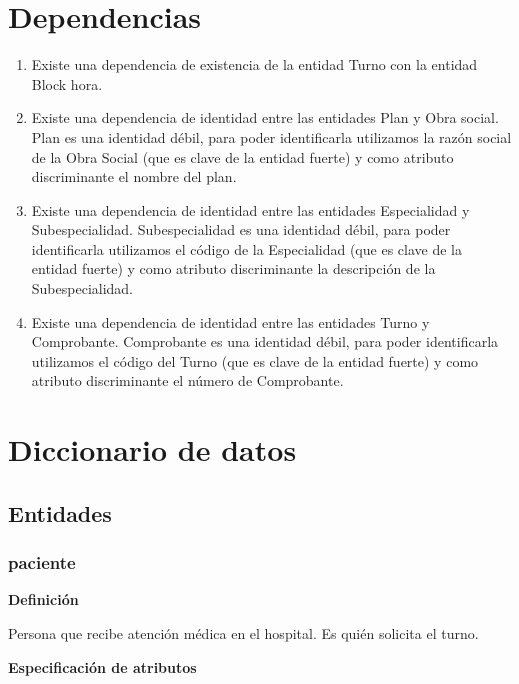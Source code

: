 \documentclass[a4paper,11pt]{article}
\begin{document}
\section{\textbf{Dependencias}}
\begin{enumerate}
\item Existe una dependencia de existencia de la entidad Turno con la entidad Block 
hora.

\item Existe una dependencia de identidad entre las entidades Plan y Obra social. 
Plan es una identidad débil, para poder identificarla utilizamos la razón social 
de la Obra Social (que es clave de la entidad fuerte) y como atributo discriminante 
el nombre del plan.

\item Existe una dependencia de identidad entre las entidades Especialidad y Subespecialidad. 
Subespecialidad es una identidad débil, para poder identificarla utilizamos el 
código de la Especialidad (que es clave de la entidad fuerte) y como atributo 
discriminante la descripción de la Subespecialidad.

\item Existe una dependencia de identidad entre las entidades Turno y Comprobante. 
Comprobante es una identidad débil, para poder identificarla utilizamos el código 
del Turno (que es clave de la entidad fuerte) y como atributo discriminante el 
número de Comprobante.\pagebreak{}
\end{enumerate}


\section{\textbf{Diccionario de datos}}

\subsection{\textbf{Entidades}}

\subsubsection{\textbf{paciente}}

\textbf{Definición}

Persona que recibe atención médica en el hospital. Es quién solicita el turno. 

\textbf{Especificación de atributos}
\end{document}
